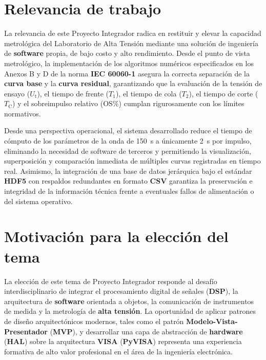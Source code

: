 \section{Relevancia de trabajo} \label{sec:relevancia}

La relevancia de este Proyecto Integrador radica en restituir y elevar la capacidad metrológica del Laboratorio de Alta Tensión mediante una solución de ingeniería de \textbf{software} propia, de bajo costo y alto rendimiento. Desde el punto de vista metrológico, la implementación de los algoritmos numéricos especificados en los Anexos B y D de la norma \textbf{IEC 60060-1} \cite{iec60060_1} asegura la correcta separación de la \textbf{curva base} y la \textbf{curva residual}, garantizando que la evaluación de la tensión de ensayo ($U_\text{t}$), el tiempo de frente ($T_1$), el tiempo de cola ($T_2$), el tiempo de corte ($T_\text{C}$) y el sobreimpulso relativo ($\text{OS}\%$) cumplan rigurosamente con los límites normativos.

Desde una perspectiva operacional, el sistema desarrollado reduce el tiempo de cómputo de los parámetros de la onda de \qty{150}{\second} a únicamente \qty{2}{\second} por impulso, eliminando la necesidad de software de terceros y permitiendo la visualización, superposición y comparación inmediata de múltiples curvas registradas en tiempo real. Asimismo, la integración de una base de datos jerárquica bajo el estándar \textbf{HDF5} con respaldos redundantes en formato \textbf{CSV} garantiza la preservación e integridad de la información técnica frente a eventuales fallos de alimentación o del sistema operativo.

\section{Motivación para la elección del tema} \label{sec:motivacion}

La elección de este tema de Proyecto Integrador responde al desafío interdisciplinario de integrar el procesamiento digital de señales (\textbf{DSP}), la arquitectura de \textbf{software} orientada a objetos, la comunicación de instrumentos de medida y la metrología de \textbf{alta tensión}. La oportunidad de aplicar patrones de diseño arquitectónicos modernos, tales como el patrón \textbf{Modelo-Vista-Presentador} (\textbf{MVP}), y desarrollar una capa de abstracción de \textbf{hardware} (\textbf{HAL}) sobre la arquitectura \textbf{VISA} (\textbf{PyVISA}) representa una experiencia formativa de alto valor profesional en el área de la ingeniería electrónica.

